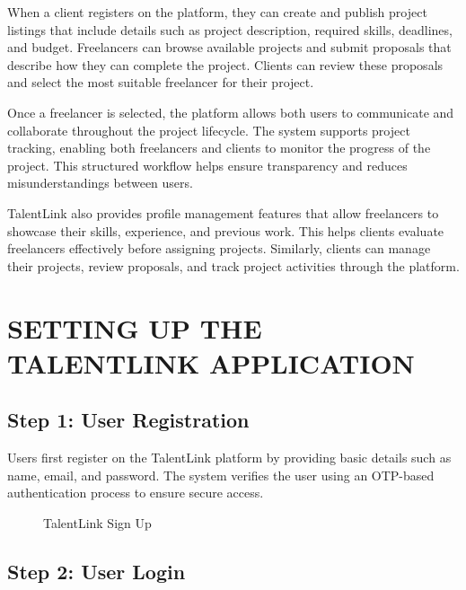 \documentclass[12pt,a4paper,oneside]{report}
\numberwithin{figure}{chapter}
\numberwithin{table}{chapter}
\begin{document}
\indent When a client registers on the platform, they can create and publish project
listings that include details such as project description, required skills, deadlines, and
budget. Freelancers can browse available projects and submit proposals that describe how
they can complete the project. Clients can review these proposals and select the most
suitable freelancer for their project.

\indent Once a freelancer is selected, the platform allows both users to communicate and
collaborate throughout the project lifecycle. The system supports project tracking,
enabling both freelancers and clients to monitor the progress of the project. This
structured workflow helps ensure transparency and reduces misunderstandings between users.

\indent TalentLink also provides profile management features that allow freelancers to
showcase their skills, experience, and previous work. This helps clients evaluate
freelancers effectively before assigning projects. Similarly, clients can manage their
projects, review proposals, and track project activities through the platform.

\section{SETTING UP THE TALENTLINK APPLICATION}

\subsection{Step 1: User Registration}

Users first register on the TalentLink platform by providing basic details such as name,
email, and password. The system verifies the user using an OTP-based authentication
process to ensure secure access.

\begin{figure}[H]
  \centering
  \caption{TalentLink Sign Up}
  \label{fig:signup}
\end{figure}

\subsection{Step 2: User Login}
\end{document}
